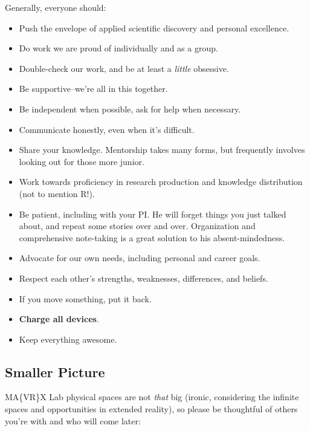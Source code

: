 \documentclass[]{tufte-book}
\providecommand{\tightlist}{%
  \setlength{\itemsep}{0pt}\setlength{\parskip}{0pt}}
\begin{document}
Generally, everyone should:

\begin{itemize}
\tightlist
\item
  Push the envelope of applied scientific discovery and personal excellence.
\item
  Do work we are proud of individually and as a group.
\item
  Double-check our work, and be at least a \emph{little} obsessive.
\item
  Be supportive--we're all in this together.
\item
  Be independent when possible, ask for help when necessary.
\item
  Communicate honestly, even when it's difficult.
\item
  Share your knowledge. Mentorship takes many forms, but frequently involves looking out for those more junior.
\item
  Work towards proficiency in research production and knowledge distribution (not to mention R!).
\item
  Be patient, including with your PI. He will forget things you just talked about, and repeat some stories over and over. Organization and comprehensive note-taking is a great solution to his absent-mindedness.
\item
  Advocate for our own needs, including personal and career goals.
\item
  Respect each other's strengths, weaknesses, differences, and beliefs.
\item
  If you move something, put it back.
\item
  \textbf{Charge all devices}.
\item
  Keep everything awesome.
\end{itemize}

\hypertarget{smaller-picture}{%
\subsection{Smaller Picture}\label{smaller-picture}}

MA\{VR\}X Lab physical spaces are not \emph{that} big (ironic, considering the infinite spaces and opportunities in extended reality), so please be thoughtful of others you're with and who will come later:
\end{document}
